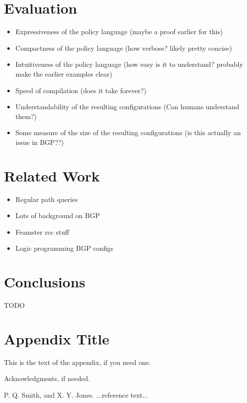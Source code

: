 \documentclass{sigplanconf}
\begin{document}
\section{Evaluation}

\begin{itemize}
	\item Expressiveness of the policy language (maybe a proof earlier for this)
	\item Compactness of the policy language (how verbose? likely pretty concise)
	\item Intuitiveness of the policy language (how easy is it to understand? probably make the earlier examples clear)
	\item Speed of compilation (does it take forever?)
	\item Understandability of the resulting configurations (Can humans understand them?)
	\item Some measure of the size of the resulting configurations (is this actually an issue in BGP??)
\end{itemize}

\section{Related Work}

\begin{itemize}
	\item Regular path queries
	\item Lots of background on BGP
	\item Feamster rcc stuff
	\item Logic programming BGP configs
\end{itemize}

\section{Conclusions}

TODO

\appendix
\section{Appendix Title}

This is the text of the appendix, if you need one.

\acks

Acknowledgments, if needed.





\begin{thebibliography}{}
\softraggedright

P. Q. Smith, and X. Y. Jones. ...reference text...

\end{thebibliography}
\end{document}
